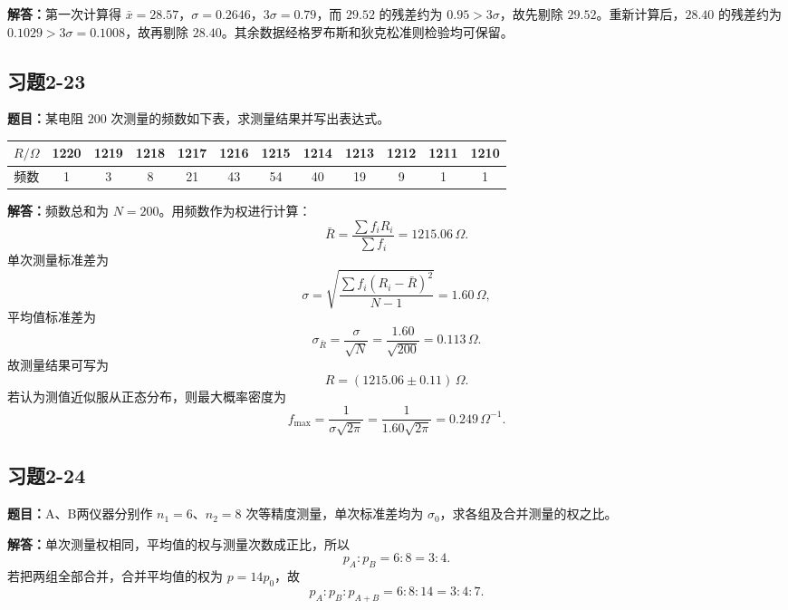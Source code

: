 \documentclass[UTF8,zihao=-4]{ctexart}
\newcommand{\problem}[1]{\subsection*{#1}}
\newcommand{\timu}{\noindent\textbf{题目：}}
\newcommand{\jieda}{\noindent\textbf{解答：}}
\begin{document}
{\jieda 第一次计算得 $\bar{x}=28.57$，$\sigma=0.2646$，$3\sigma=0.79$，而 $29.52$ 的残差约为 $0.95>3\sigma$，故先剔除 $29.52$。重新计算后，$28.40$ 的残差约为 $0.1029>3\sigma=0.1008$，故再剔除 $28.40$。其余数据经格罗布斯和狄克松准则检验均可保留。

\problem{习题2-23}
\timu 某电阻 $200$ 次测量的频数如下表，求测量结果并写出表达式。

\begin{center}
\scriptsize
\setlength{\tabcolsep}{4pt}
\begin{tabular}{c|ccccccccccc}
\toprule
$R/\Omega$ & 1220 & 1219 & 1218 & 1217 & 1216 & 1215 & 1214 & 1213 & 1212 & 1211 & 1210\\
\midrule
频数 & 1 & 3 & 8 & 21 & 43 & 54 & 40 & 19 & 9 & 1 & 1\\
\bottomrule
\end{tabular}
\end{center}

\jieda 频数总和为 $N=200$。用频数作为权进行计算：
\begin{equation*}
    \bar{R}=\frac{\sum f_iR_i}{\sum f_i}=1215.06\,\Omega.
\end{equation*}
单次测量标准差为
\begin{equation*}
    \sigma=\sqrt{\frac{\sum f_i(R_i-\bar R)^2}{N-1}}=1.60\,\Omega,
\end{equation*}
平均值标准差为
\begin{equation*}
    \sigma_{\bar{R}}=\frac{\sigma}{\sqrt{N}}=\frac{1.60}{\sqrt{200}}=0.113\,\Omega.
\end{equation*}
故测量结果可写为
\begin{equation*}
    R=(1215.06\pm0.11)\,\Omega.
\end{equation*}
若认为测值近似服从正态分布，则最大概率密度为
\begin{equation*}
    f_{\max}=\frac{1}{\sigma\sqrt{2\pi}}=\frac{1}{1.60\sqrt{2\pi}}=0.249\,\Omega^{-1}.
\end{equation*}

\problem{习题2-24}
\timu A、B两仪器分别作 $n_1=6$、$n_2=8$ 次等精度测量，单次标准差均为 $\sigma_0$，求各组及合并测量的权之比。

\jieda 单次测量权相同，平均值的权与测量次数成正比，所以
\begin{equation*}
    p_A:p_B=6:8=3:4.
\end{equation*}
若把两组全部合并，合并平均值的权为 $p=14p_0$，故
\begin{equation*}
    p_A:p_B:p_{A+B}=6:8:14=3:4:7.
\end{equation*}

}
\end{document}
